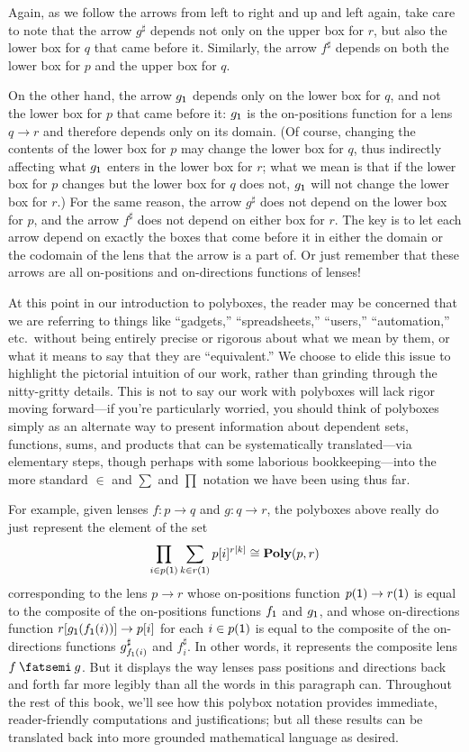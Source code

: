 \documentclass[Book-Poly]{subfiles}
\begin{document}
Again, as we follow the arrows from left to right and up and left again, take care to note that the arrow $g^\sharp$ depends not only on the upper box for $r$, but also the lower box for $q$ that came before it.
Similarly, the arrow $f^\sharp$ depends on both the lower box for $p$ and the upper box for $q$.

On the other hand, the arrow $g_{\textsf{1}}$ depends only on the lower box for $q$, and not the lower box for $p$ that came before it: $g_{\textsf{1}}$ is the on-positions function for a lens $q\to r$ and therefore depends only on its domain. (Of course, changing the contents of the lower box for $p$ may change the lower box for $q$, thus indirectly affecting what $g_{\textsf{1}}$ enters in the lower box for $r$; what we mean is that if the lower box for $p$ changes but the lower box for $q$ does not, $g_{\textsf{1}}$ will not change the lower box for $r$.)
For the same reason, the arrow $g^\sharp$ does not depend on the lower box for $p$, and the arrow $f^\sharp$ does not depend on either box for $r$.
The key is to let each arrow depend on exactly the boxes that come before it in either the domain or the codomain of the lens that the arrow is a part of.
Or just remember that these arrows are all on-positions and on-directions functions of lenses!

\begin{remark}
At this point in our introduction to polyboxes, the reader may be concerned that we are referring to things like ``gadgets,'' ``spreadsheets,'' ``users,'' ``automation,'' etc.\ without being entirely precise or rigorous about what we mean by them, or what it means to say that they are ``equivalent.''
We choose to elide this issue to highlight the pictorial intuition of our work, rather than grinding through the nitty-gritty details.
This is not to say our work with polyboxes will lack rigor moving forward---if you're particularly worried, you should think of polyboxes simply as an alternate way to present information about dependent sets, functions, sums, and products that can be systematically translated---via elementary steps, though perhaps with some laborious bookkeeping---into the more standard $\in$ and $\sum$ and $\prod$ notation we have been using thus far.

For example, given lenses $f\colon p\to q$ and $g\colon q\to r$, the polyboxes above really do just represent the element of the set
\[
    \prod_{i\in p(\textsf{1})}\sum_{k\in r(\textsf{1})}p[i]^{r[k]}\cong\mathbf{Poly}(p,r)
\]
corresponding to the lens $p\to r$ whose on-positions function $p(\textsf{1})\to r(\textsf{1})$ is equal to the composite of the on-positions functions $f_{\textsf{1}}$ and $g_{\textsf{1}}$, and whose on-directions function $r[g_{\textsf{1}}(f_{\textsf{1}}(i))]\to p[i]$ for each $i\in p(\textsf{1})$ is equal to the composite of the on-directions functions $g^\sharp_{f_{\textsf{1}}(i)}$ and $f^\sharp_i$.
In other words, it represents the composite lens $f\then g$.
But it displays the way lenses pass positions and directions back and forth far more legibly than all the words in this paragraph can.
Throughout the rest of this book, we'll see how this polybox notation provides immediate, reader-friendly computations and justifications; but all these results can be translated back into more grounded mathematical language as desired.
\end{remark}
\end{document}
